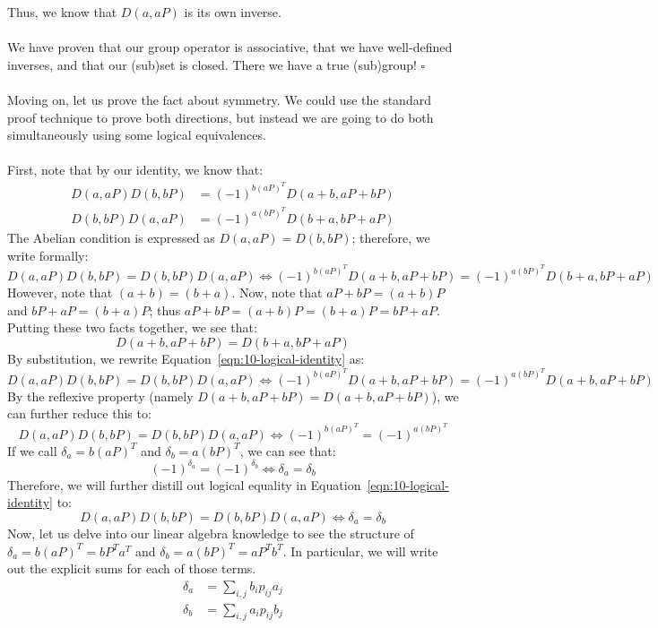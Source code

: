 \documentclass[letterpaper]{article}
\newcommand*{\QED}{\hfill\ensuremath{\square}}%
\begin{document}
Thus, we know that $ D(a, aP) $ is its own inverse.
\\ \\
We have proven that our group operator is associative, that we have well-defined inverses, and that our (sub)set is closed.
There we have a true (sub)group!
\QED{}
\\ \\
Moving on, let us prove the fact about symmetry.
We could use the standard proof technique to prove both directions, but instead we are going to do both simultaneously using some logical equivalences.
\\ \\
First, note that by our identity, we know that:
\begin{align}
    D(a, aP)D(b, bP) &= {(-1)}^{b{(aP)}^T} D(a + b, aP + bP) \\
    D(b, bP)D(a, aP) &= {(-1)}^{a{(bP)}^T} D(b + a, bP + aP)
\end{align}
The Abelian condition is expressed as $ D(a, aP) = D(b, bP) $; therefore, we write formally:
\begin{equation}
    \label{eqn:10-logical-identity}
    D(a, aP)D(b, bP) = D(b, bP) D(a, aP) \iff {(-1)}^{b{(aP)}^T} D(a + b, aP + bP) = {(-1)}^{a{(bP)}^T} D(b + a, bP + aP)
\end{equation}
However, note that $ (a + b) = (b + a) $.
Now, note that $ aP + bP = (a + b)P $ and $ bP + aP = (b + a)P $; thus $ aP + bP = (a + b)P = (b + a)P = bP + aP $.
Putting these two facts together, we see that:
\[
D(a + b, aP + bP) = D(b + a, bP + aP)
\]
By substitution, we rewrite Equation~\ref{eqn:10-logical-identity} as:
\[
D(a, aP)D(b, bP) = D(b, bP) D(a, aP) \iff {(-1)}^{b{(aP)}^T} D(a + b, aP + bP) = {(-1)}^{a{(bP)}^T} D(a + b, aP + bP)
\]
By the reflexive property (namely $ D(a + b, aP + bP) = D(a + b, aP + bP) $), we can further reduce this to:
\[
D(a, aP)D(b, bP) = D(b, bP) D(a, aP) \iff {(-1)}^{b{(aP)}^T} = {(-1)}^{a{(bP)}^T}
\]
If we call $ \delta_a = b{(aP)}^T $ and $ \delta_b = a{(bP)}^T $, we can see that:
\[
{(-1)}^{\delta_a} = {(-1)}^{\delta_b} \iff \delta_a = \delta_b
\]
Therefore, we will further distill out logical equality in Equation~\ref{eqn:10-logical-identity} to:
\[
D(a, aP)D(b, bP) = D(b, bP) D(a, aP) \iff \delta_a = \delta_b
\]
Now, let us delve into our linear algebra knowledge to see the structure of $ \delta_a = b{(aP)}^T = bP^T a^T $ and $ \delta_b = a{(bP)}^T = aP^T b^T $.
In particular, we will write out the explicit sums for each of those terms.
\begin{align}
    \delta_a &= \sum_{i, j} b_i p_{ij} a_j \\
    \delta_b &= \sum_{i, j} a_i p_{ij} b_j
\end{align}
\end{document}
